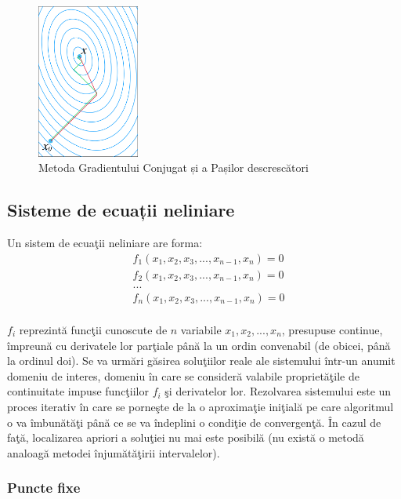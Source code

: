 \documentclass{exam}
\begin{document}
\begin{figure}[H]
	\centering
	\includegraphics[width=0.3\textwidth]{conjugate_vs_steepest.png}
	\caption{Metoda Gradientului Conjugat și a Pașilor descrescători}
	\label{fig:2}
\end{figure}

\subsection{Sisteme de ecuații neliniare}
Un sistem de ecuaţii neliniare are forma:
\begin{align*}
	 & f_{1}(x_{1},x_{2},x_{3},...,x_{n-1},x_{n})=0 \\
	 & f_{2}(x_{1},x_{2},x_{3},...,x_{n-1},x_{n})=0 \\
	 & ...                                          \\
	 & f_{n}(x_{1},x_{2},x_{3},...,x_{n-1},x_{n})=0 \\
\end{align*}

$f_{i}$ reprezintă funcţii cunoscute de $n$ variabile $x_{1}, x_{2}, ..., x_{n}$,
presupuse continue, împreună cu derivatele lor parţiale până la un ordin
convenabil (de obicei, până la ordinul doi). Se va urmări găsirea soluţiilor
reale ale sistemului într-un anumit domeniu de interes, domeniu în care se
consideră valabile proprietăţile de continuitate impuse funcţiilor
$f_{i}$ şi derivatelor lor. Rezolvarea sistemului este un proces iterativ în
care se porneşte de la o aproximaţie iniţială pe care algoritmul o va îmbunătăţi
până ce se va îndeplini o condiţie de convergenţă. În cazul de faţă, localizarea
apriori a soluţiei nu mai este posibilă (nu există o metodă analoagă metodei
înjumătăţirii intervalelor).

\subsubsection{Puncte fixe}
\end{document}
